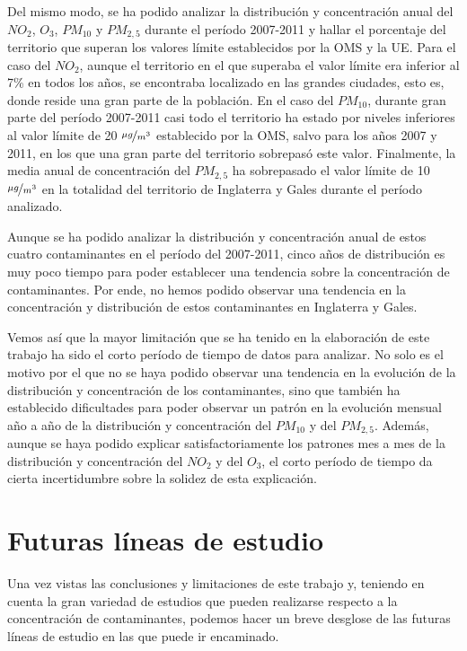 \documentclass[12pt]{article}
\begin{document}
Del mismo modo, se ha podido analizar la distribución y concentración anual del $NO_{2}$, $O_{3}$, $PM_{10}$ y $PM_{2,5}$ durante el período 2007-2011 y hallar el porcentaje del territorio que superan los valores límite establecidos por la OMS y la UE. Para el caso del $NO_{2}$, aunque el territorio en el que superaba el valor límite era inferior al 7\% en todos los años, se encontraba localizado en las grandes ciudades, esto es, donde reside una gran parte de la población. En el caso del $PM_{10}$, durante gran parte del período 2007-2011 casi todo el territorio ha estado por niveles inferiores al valor límite de 20 $\nicefrac{\mu g}{m^{3}}$ establecido por la OMS, salvo para los años 2007 y 2011, en los que una gran parte del territorio sobrepasó este valor. Finalmente, la media anual de concentración del $PM_{2,5}$ ha sobrepasado el valor límite de 10 $\nicefrac{\mu g}{m^{3}}$ en la totalidad del territorio de Inglaterra y Gales durante el período analizado.

Aunque se ha podido analizar la distribución y concentración anual de estos cuatro contaminantes en el período del 2007-2011, cinco años de distribución es muy poco tiempo para poder establecer una tendencia sobre la concentración de contaminantes. Por ende, no hemos podido observar una tendencia en la concentración y distribución de estos contaminantes en Inglaterra y Gales.

Vemos así que la mayor limitación que se ha tenido en la elaboración de este trabajo ha sido el corto período de tiempo de datos para analizar. No solo es el motivo por el que no se haya podido observar una tendencia en la evolución de la distribución y concentración de los contaminantes, sino que también ha establecido dificultades para poder observar un patrón en la evolución mensual año a año de la distribución y concentración del $PM_{10}$ y del $PM_{2,5}$. Además, aunque se haya podido explicar satisfactoriamente los patrones mes a mes de la distribución y concentración del $NO_{2}$ y del $O_{3}$, el corto período de tiempo da cierta incertidumbre sobre la solidez de esta explicación.

\newpage

\section{Futuras líneas de estudio}

Una vez vistas las conclusiones y limitaciones de este trabajo y, teniendo en cuenta la gran variedad de estudios que pueden realizarse respecto a la concentración de contaminantes, podemos hacer un breve desglose de las futuras líneas de estudio en las que puede ir encaminado.
\end{document}
